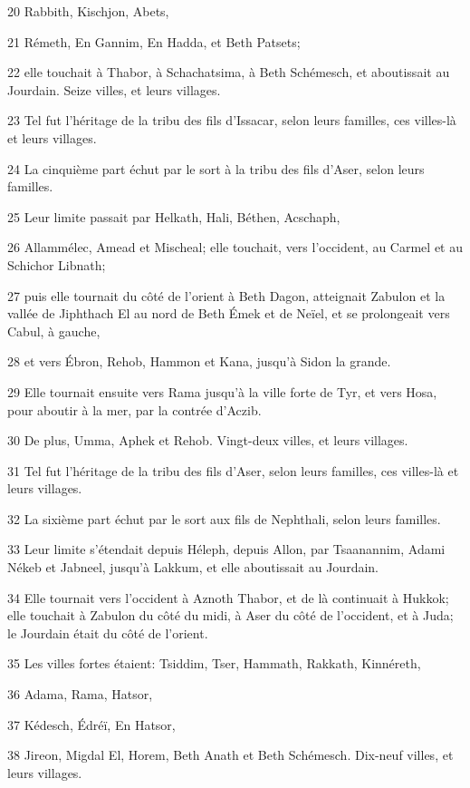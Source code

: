 \par 20 Rabbith, Kischjon, Abets,
\par 21 Rémeth, En Gannim, En Hadda, et Beth Patsets;
\par 22 elle touchait à Thabor, à Schachatsima, à Beth Schémesch, et aboutissait au Jourdain. Seize villes, et leurs villages.
\par 23 Tel fut l'héritage de la tribu des fils d'Issacar, selon leurs familles, ces villes-là et leurs villages.
\par 24 La cinquième part échut par le sort à la tribu des fils d'Aser, selon leurs familles.
\par 25 Leur limite passait par Helkath, Hali, Béthen, Acschaph,
\par 26 Allammélec, Amead et Mischeal; elle touchait, vers l'occident, au Carmel et au Schichor Libnath;
\par 27 puis elle tournait du côté de l'orient à Beth Dagon, atteignait Zabulon et la vallée de Jiphthach El au nord de Beth Émek et de Neïel, et se prolongeait vers Cabul, à gauche,
\par 28 et vers Ébron, Rehob, Hammon et Kana, jusqu'à Sidon la grande.
\par 29 Elle tournait ensuite vers Rama jusqu'à la ville forte de Tyr, et vers Hosa, pour aboutir à la mer, par la contrée d'Aczib.
\par 30 De plus, Umma, Aphek et Rehob. Vingt-deux villes, et leurs villages.
\par 31 Tel fut l'héritage de la tribu des fils d'Aser, selon leurs familles, ces villes-là et leurs villages.
\par 32 La sixième part échut par le sort aux fils de Nephthali, selon leurs familles.
\par 33 Leur limite s'étendait depuis Héleph, depuis Allon, par Tsaanannim, Adami Nékeb et Jabneel, jusqu'à Lakkum, et elle aboutissait au Jourdain.
\par 34 Elle tournait vers l'occident à Aznoth Thabor, et de là continuait à Hukkok; elle touchait à Zabulon du côté du midi, à Aser du côté de l'occident, et à Juda; le Jourdain était du côté de l'orient.
\par 35 Les villes fortes étaient: Tsiddim, Tser, Hammath, Rakkath, Kinnéreth,
\par 36 Adama, Rama, Hatsor,
\par 37 Kédesch, Édréï, En Hatsor,
\par 38 Jireon, Migdal El, Horem, Beth Anath et Beth Schémesch. Dix-neuf villes, et leurs villages.
